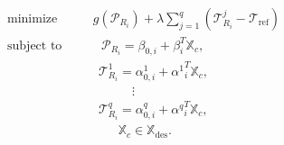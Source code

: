 \begin{align}
\begin{aligned}
\text{minimize } \ \ \ & \ \ \ g\left(\mathcal{P}_{R_i}\right) + \lambda \sum_{j=1}^{q} \left( \mathcal{T}^j_{R_i} - \mathcal{T}_{\mathrm{ref}}\right) \\ \text{subject to } \ \ \ &  \ \ \ \ \ \ \mathcal{P}_{R_i} = \beta_{0,i} + \beta^T_i \mathbb{X}_c, \\ \ \ \ & \ \ \ \ \ \mathcal{T}_{R_i}^1 = \alpha_{0,i}^1 + {\alpha^1}^T_i \mathbb{X}_c,  \\ \ \ \ & \ \ \ \ \ \ \ \ \ \ \ \ \ \ \ \ \ \vdots \\ \ \ \ & \ \ \ \ \ \mathcal{T}_{R_i}^q = \alpha_{0,i}^q + {\alpha^q}^T_i \mathbb{X}_c, \\ \ \ \ & \ \ \ \ \ \ \ \ \ \ \ \ \mathbb{X}_c \in \mathbb{X}_{\mathrm{des}}.
  \end{aligned}
\label{eq:synth_program}  
\end{align}
